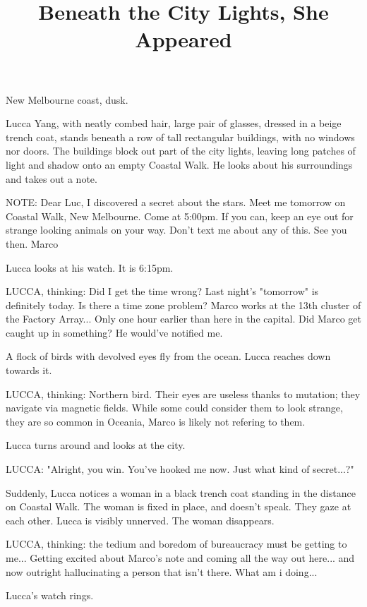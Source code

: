 \documentclass[11pt]{article}
\begin{document}
\ttfamily
\title{Beneath the City Lights, She Appeared}
\maketitle

New Melbourne coast, dusk.

Lucca Yang, with neatly combed hair, large pair of glasses, dressed in a beige trench coat, stands beneath a row of tall rectangular buildings, with no windows nor doors. 
The buildings block out part of the city lights, leaving long patches of light and shadow onto an empty Coastal Walk.
He looks about his surroundings and takes out a note.

NOTE: Dear Luc, I discovered a secret about the stars. 
Meet me tomorrow on Coastal Walk, New Melbourne. Come at 5:00pm.
If you can, keep an eye out for strange looking animals on your way. 
Don't text me about any of this. See you then.
Marco

Lucca looks at his watch. It is 6:15pm. 

LUCCA, thinking: Did I get the time wrong? Last night's "tomorrow" is definitely today. 
Is there a time zone problem? Marco works at the 13th cluster of the Factory Array... Only one hour earlier than here in the capital. 
Did Marco get caught up in something? He would've notified me.

A flock of birds with devolved eyes fly from the ocean. Lucca reaches down towards it.

LUCCA, thinking: Northern bird. Their eyes are useless thanks to mutation; they navigate via magnetic fields. While some could consider them to look strange, they are so common in Oceania, Marco is likely not refering to them. 

Lucca turns around and looks at the city.

LUCCA: "Alright, you win. You've hooked me now. Just what kind of secret...?"

Suddenly, Lucca notices a woman in a black trench coat standing in the distance on Coastal Walk. The woman is fixed in place, and doesn't speak. They gaze at each other. Lucca is visibly unnerved. The woman disappears. 

LUCCA, thinking: the tedium and boredom of bureaucracy must be getting to me... Getting excited about Marco's note and coming all the way out here... and now outright hallucinating a person that isn't there. What am i doing...

Lucca's watch rings. 
\end{document}
